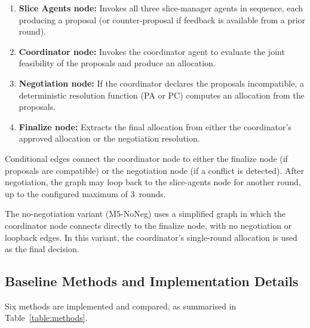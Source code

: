 \begin{enumerate}
    \item \textbf{Slice Agents node:} Invokes all three slice-manager agents in sequence, each producing a proposal (or counter-proposal if feedback is available from a prior round).
    \item \textbf{Coordinator node:} Invokes the coordinator agent to evaluate the joint feasibility of the proposals and produce an allocation.
    \item \textbf{Negotiation node:} If the coordinator declares the proposals incompatible, a deterministic resolution function (PA or PC) computes an allocation from the proposals.
    \item \textbf{Finalize node:} Extracts the final allocation from either the coordinator's approved allocation or the negotiation resolution.
\end{enumerate}

Conditional edges connect the coordinator node to either the finalize node (if proposals are compatible) or the negotiation node (if a conflict is detected). After negotiation, the graph may loop back to the slice-agents node for another round, up to the configured maximum of 3~rounds.

The no-negotiation variant (M5-NoNeg) uses a simplified graph in which the coordinator node connects directly to the finalize node, with no negotiation or loopback edges. In this variant, the coordinator's single-round allocation is used as the final decision.

\subsection{Baseline Methods and Implementation Details}

Six methods are implemented and compared, as summarised in Table~\ref{table:methods}.

